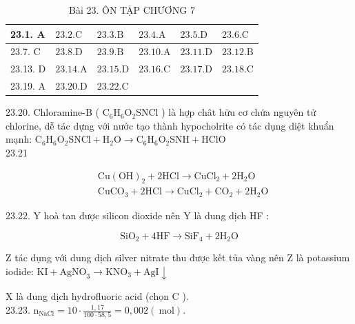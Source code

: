 \documentclass[10pt]{article}
\begin{document}
\begin{table}[h]
\begin{center}
\captionsetup{labelformat=empty}
\caption{Bài 23. ÔN TẬP CHƯƠNG 7}
\begin{tabular}{|l|l|l|l|l|l|}
\hline
23.1. A & $23.2 . \mathrm{C}$ & $23.3 . \mathrm{B}$ & $23.4 . \mathrm{A}$ & $23.5 . \mathrm{D}$ & $23.6 . \mathrm{C}$ \\
\hline
23.7. C & $23.8 . \mathrm{D}$ & $23.9 . \mathrm{B}$ & $23.10 . \mathrm{A}$ & $23.11 . \mathrm{D}$ & $23.12 . \mathrm{B}$ \\
\hline
23.13. D & $23.14 . \mathrm{A}$ & $23.15 . \mathrm{D}$ & $23.16 . \mathrm{C}$ & $23.17 . \mathrm{D}$ & $23.18 . \mathrm{C}$ \\
\hline
23.19. A & $23.20 . \mathrm{D}$ & $23.22 . \mathrm{C}$ &  &  &  \\
\hline
\end{tabular}
\end{center}
\end{table}

23.20. Chloramine-B ( $\mathrm{C}_{6} \mathrm{H}_{6} \mathrm{O}_{2} \mathrm{SNCl}$ ) là hợp chât hữu cơ chứa nguyên tử chlorine, dễ tác dựng với nước tạo thành hypocholrite có tác dụng diệt khuẩn mạnh: $\mathrm{C}_{6} \mathrm{H}_{6} \mathrm{O}_{2} \mathrm{SNCl}+\mathrm{H}_{2} \mathrm{O} \longrightarrow \mathrm{C}_{6} \mathrm{H}_{6} \mathrm{O}_{2} \mathrm{SNH}+\mathrm{HClO}$\\
23.21

$$
\begin{aligned}
& \mathrm{Cu}(\mathrm{OH})_{2}+2 \mathrm{HCl} \longrightarrow \mathrm{CuCl}_{2}+2 \mathrm{H}_{2} \mathrm{O} \\
& \mathrm{CuCO}_{3}+2 \mathrm{HCl} \longrightarrow \mathrm{CuCl}_{2}+\mathrm{CO}_{2}+2 \mathrm{H}_{2} \mathrm{O}
\end{aligned}
$$

23.22. Y hoà tan được silicon dioxide nên Y là dung dịch HF :

$$
\mathrm{SiO}_{2}+4 \mathrm{HF} \longrightarrow \mathrm{SiF}_{4}+2 \mathrm{H}_{2} \mathrm{O}
$$

Z tác dụng với dung dịch silver nitrate thu được kết tủa vàng nên Z là potassium iodide: $\mathrm{KI}+\mathrm{AgNO}_{3} \longrightarrow \mathrm{KNO}_{3}+\mathrm{AgI} \downarrow$

X là dung dịch hydrofluoric acid (chọn C ).\\
23.23. $\mathrm{n}_{\mathrm{NaCl}}=10 \cdot \frac{1,17}{100 \cdot 58,5}=0,002(\mathrm{~mol})$.
\end{document}
